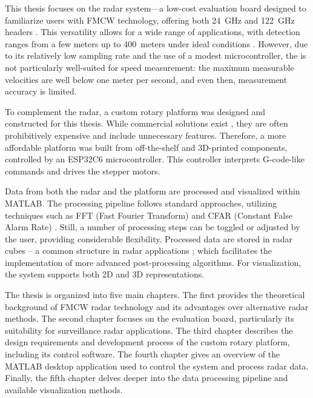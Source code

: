This thesis focuses on the \sirad radar system—a low-cost evaluation board designed to familiarize users with FMCW technology, offering both 24~GHz and 122~GHz headers \cite{siradMAN}.
This versatility allows for a wide range of applications, with detection ranges from a few meters up to 400~meters under ideal conditions \cite{siradMANOld}.
However, due to its relatively low sampling rate and the use of a modest microcontroller, the \sirad is not particularly well-suited for speed measurement: the maximum measurable velocities are well below one meter per second, and even then, measurement accuracy is limited.

To complement the radar, a custom rotary platform was designed and constructed for this thesis.
While commercial solutions exist \cite{standa, carl}, they are often prohibitively expensive and include unnecessary features.
Therefore, a more affordable platform was built from off-the-shelf and 3D-printed components, controlled by an ESP32C6 microcontroller.
This controller interprets G-code-like commands and drives the stepper motors.

Data from both the radar and the platform are processed and visualized within MATLAB.
The processing pipeline follows standard approaches, utilizing techniques such as FFT (Fast Fourier Transform) and CFAR (Constant False Alarm Rate) \cite{richards2022}.
Still, a number of processing steps can be toggled or adjusted by the user, providing considerable flexibility.
Processed data are stored in radar cubes -- a common structure in radar applications \cite{richards2022}; which facilitates the implementation of more advanced post-processing algorithms.
For visualization, the system supports both 2D and 3D representations.

The thesis is organized into five main chapters.
The first provides the theoretical background of FMCW radar technology and its advantages over alternative radar methods.
The second chapter focuses on the \sirad evaluation board, particularly its suitability for surveillance radar applications.
The third chapter describes the design requirements and development process of the custom rotary platform, including its control software.
The fourth chapter gives an overview of the MATLAB desktop application used to control the system and process radar data.
Finally, the fifth chapter delves deeper into the data processing pipeline and available visualization methods.
